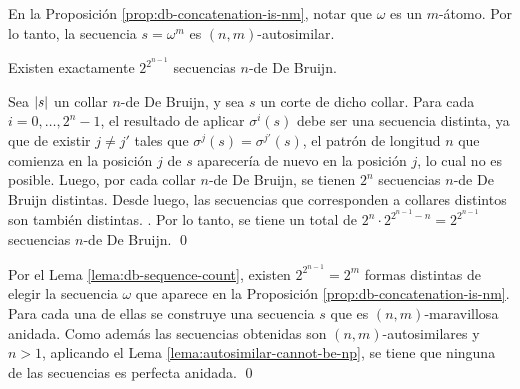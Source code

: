 \documentclass[11pt]{article}
\begin{document}


\begin{obs}
	En la Proposición \ref{prop:db-concatenation-is-nm}, notar que $\omega$ es un
	$m$-átomo. Por lo tanto, la secuencia $s = \omega^m$ es $(n,m)$-autosimilar.
\end{obs}

\begin{lema}
	\label{lema:db-sequence-count}
	Existen exactamente $2^{2^{n-1}}$ secuencias $n$-de De Bruijn.
\end{lema}

\begin{demo}
	Sea $\left\vert s\right\vert$ un collar $n$-de De Bruijn, y sea $s$ un corte de dicho
	collar. Para cada $i = 0,\dots,2^n-1$, el resultado de aplicar $\sigma^i(s)$
	debe ser una secuencia distinta, ya que de existir $j \neq j'$ tales que
	$\sigma^j(s) = \sigma^{j'}(s)$, el patrón de longitud $n$ que comienza en la
	posición $j$ de $s$ aparecería de nuevo en la posición $j$, lo cual no es
	posible. Luego, por cada collar $n$-de De Bruijn, se tienen $2^n$ secuencias
	$n$-de De Bruijn distintas. Desde luego, las secuencias que corresponden a
	collares distintos son también distintas.
	.
	Por lo tanto, se tiene un total de
	$2^n \cdot 2^{2^{n-1}-n} = 2^{2^{n-1}}$ secuencias $n$-de De Bruijn. \qed
\end{demo}




\begin{demo}
	Por el Lema \ref{lema:db-sequence-count}, existen $2^{2^{n-1}} = 2^m$ formas
	distintas de elegir la secuencia $\omega$ que aparece en la Proposición
	\ref{prop:db-concatenation-is-nm}. Para cada una de ellas se construye una
	secuencia $s$ que es $(n, m)$-maravillosa anidada. Como además las
	secuencias obtenidas son $(n,m)$-autosimilares y $n > 1$, aplicando el Lema
	\ref{lema:autosimilar-cannot-be-np}, se tiene que ninguna de las secuencias
	es perfecta anidada. \qed
\end{demo}
\end{document}
